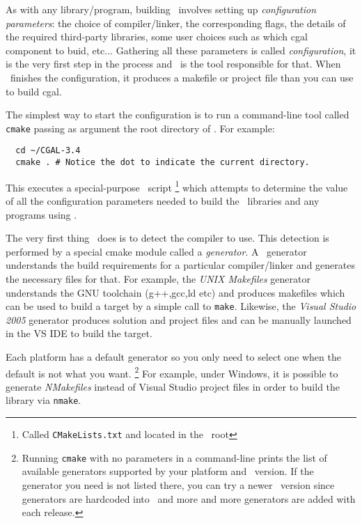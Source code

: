 As with any library/program, building \cgal\ involves setting up {\em configuration parameters}:
the choice of compiler/linker, the corresponding flags, the details of the required third-party libraries,
some user choices such as which cgal component to buid, etc... Gathering all these parameters is called
{\em configuration}, it is the very first step in the process and \cmake\ is the tool responsible for that. 
When \cmake\ finishes the configuration, it produces a makefile or project file than you can use to build cgal.

The simplest way to start the configuration is to run a command-line tool called \texttt{cmake} passing 
as argument the root directory of \cgal. For example:

{\ccTexHtml{\scriptsize}{}
\begin{verbatim}
  cd ~/CGAL-3.4
  cmake . # Notice the dot to indicate the current directory.
\end{verbatim}
}

This executes a special-purpose \cmake\ script
\footnote{Called \texttt{CMakeLists.txt} and located in the \cgal\ root} 
which attempts to determine the value of all the configuration parameters needed to build the \cgal\
libraries and any programs using \cgal. 

The very first thing \cmake\ does is to detect the compiler to use.
This detection is performed by a special cmake module called a {\em generator}. A
\cmake\ generator understands the build requirements for a particular compiler/linker
 and generates the necessary files for that. For example, the 
{\em UNIX Makefiles} generator understands the GNU toolchain (g++,gcc,ld etc) and produces makefiles
which can be used to build a target by a simple call to \texttt{make}.
Likewise, the {\em Visual Studio 2005} generator produces solution and project files and can be manually
launched in the VS IDE to build the target.

Each platform has a default generator so you only need to select one when the default is
not what you want. 
\footnote{Running \texttt{cmake} with no parameters in a command-line prints the list of available generators supported 
by your platform and \cmake\ version. If the generator you need is not listed there, you can
try a newer \cmake\ version since generators are hardcoded into \cmake\ and more and
more generators are added with each release.}
For example, under Windows, it is possible to generate {\em NMakefiles}
instead of Visual Studio project files in order to build the library via \texttt{nmake}.

